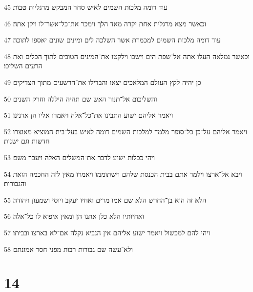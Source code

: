 \par 45 עוד דומה מלכות השמים לאיש סחר המבקש מרגליות טבות׃
\par 46 וכאשר מצא מרגלית אחת יקרה מאד הלך וימכר את־כל־אשר־לו ויקן אתה׃
\par 47 עוד דומה מלכות השמים למכמרת אשר השלכה לים ומינים שונים יאספו לתוכה׃
\par 48 וכאשר נמלאה העלו אתה אל־שפת הים וישבו וילקטו את־המינים הטובים לתוך הכלים ואת הרעים השליכו׃
\par 49 כן יהיה לקץ העולם המלאכים יצאו והבדילו את־הרשעים מתוך הצדיקים׃
\par 50 והשליכום אל־תנור האש שם תהיה היללה וחרק השנים׃
\par 51 ויאמר אליהם ישוע התבינו את־כל־אלה ויאמרו אליו הן אדנינו׃
\par 52 ויאמר אליהם על־כן כל־סופר מלמד למלכות השמים דומה לאיש בעל־בית המוציא מאוצרו חדשות וגם ישנות׃
\par 53 ויהי ככלות ישוע לדבר את־המשלים האלה ויעבר משם׃
\par 54 ויבא אל־ארצו וילמד אתם בבית הכנסת שלהם וישתוממו ויאמרו מאין לזה החכמה הזאת והגבורות׃
\par 55 הלא זה הוא בן־החרש הלא שם אמו מרים ואחיו יעקב ויוסי ושמעון ויהודה׃
\par 56 ואחיותיו הלא כלן אתנו הן ומאין איפוא לו כל־אלה׃
\par 57 ויהי להם למכשול ויאמר ישוע אליהם אין הנביא נקלה אם־לא בארצו ובביתו׃
\par 58 ולא־עשה שם גבורות רבות מפני חסר אמונתם׃

\chapter{14}

